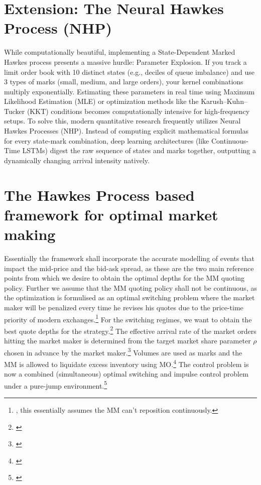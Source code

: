 \documentclass[12pt,a4paper]{cau_thesis}
\begin{document}
\section{Extension: The Neural Hawkes Process (NHP)}\label{sec:extension_neural_hawkes_process}
While computationally beautiful, implementing a State-Dependent
Marked Hawkes process presents a massive hurdle: Parameter Explosion.
If you track a limit order book with 10 distinct states (e.g.,
deciles of queue imbalance) and use 3 types of marks (small, medium,
and large orders), your kernel combinations multiply exponentially.
Estimating these parameters in real time using Maximum Likelihood
Estimation (MLE) or optimization methods like the Karush–Kuhn–Tucker
(KKT) conditions becomes computationally intensive for high-frequency
setups. To solve this, modern quantitative research frequently
utilizes Neural Hawkes Processes (NHP). Instead of computing explicit
mathematical formulas for every state-mark combination, deep learning
architectures (like Continuous-Time LSTMs) digest the raw sequence of
states and marks together, outputting a dynamically changing arrival
intensity natively.

\section{The Hawkes Process based framework for optimal market making}\label{sec:hawkes_process_framework}
Essentially the framework shall incorporate the accurate modelling of
events that impact the mid-price and the bid-ask spread, as these are
the two main reference points from which we desire to obtain the
optimal depths for the MM quoting policy. Further we assume that the
MM quoting policy shall not be continuous, as the optimization is
formulised as an optimal switching problem where the market maker
will be penalized every time he revises his quotes due to the
price-time priority of modern exchanges.\footnote{\cite[See][,
        p.8]{law2015pure}, this essentially assumes the MM can't reposition
    continuously.} For the switching regimes, we want to obtain the best
quote depths for the strategy.\footnote{\cite[see][,
        p.9]{law2015pure}} The effective arrival rate of the market orders
hitting the market maker is determined from the target market share
parameter $\rho$ chosen in advance by the market
maker.\footnote{\cite[see][, p.9]{law2015pure}} Volumes are used as
marks and the MM is allowed to liquidate excess inventory using
MO.\footnote{\cite[see][, p.9]{law2015pure}} The control problem is
now a combined (simultaneous) optimal switching and impulse control
problem under a pure-jump environment.\footnote{\cite[see][,
        p.9]{law2015pure}}
\end{document}
